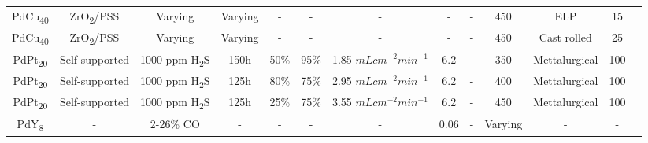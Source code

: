 \begin{longtable}{@{\extracolsep{\fill}}ccccccccccccc@{}}
    PdCu\textsubscript{40}                       & ZrO\textsubscript{2}/PSS              &  Varying   & Varying          & -               & -  & -       & -                             & -        & 450                                    & ELP                  & 15                                                                             & \cite{Kulprathipanja2005}                  \\

    PdCu\textsubscript{40}                       & ZrO\textsubscript{2}/PSS              &  Varying   & Varying          & -               & -  & -       & -                             & -        & 450                                    & Cast rolled                  & 25                                                                             & \cite{Kulprathipanja2005}                  \\

    PdPt\textsubscript{20}                       &      Self-supported         &  1000 ppm H\textsubscript{2}S   & 150h          & 50\%               & 95\%  & 1.85 $mL cm^{-2}min^{-1}$       & 6.2                             & -        & 350                                    & Mettalurgical                  & 100                                                                             & \cite{Howard2008a}                  \\

    PdPt\textsubscript{20}                       &      Self-supported         &  1000 ppm H\textsubscript{2}S   & 125h          & 80\%               & 75\%  & 2.95 $mL cm^{-2}min^{-1}$       & 6.2                             & -        & 400                                    & Mettalurgical                  & 100                                                                             & \cite{Howard2008a}                  \\

    PdPt\textsubscript{20}                       &      Self-supported         &  1000 ppm H\textsubscript{2}S   & 125h          & 25\%               & 75\%  & 3.55 $mL cm^{-2}min^{-1}$       & 6.2                             & -        & 450                                    & Mettalurgical                  & 100                                                                             & \cite{Howard2008a}                  \\

    PdY\textsubscript{8}                       &      -         &  2-26\% CO    & -          & -               & -  & -       & 0.06                             & -        & Varying                                    & -                  & -                                                                             & \cite{Peng2009a}                  \\
    

\end{longtable}
